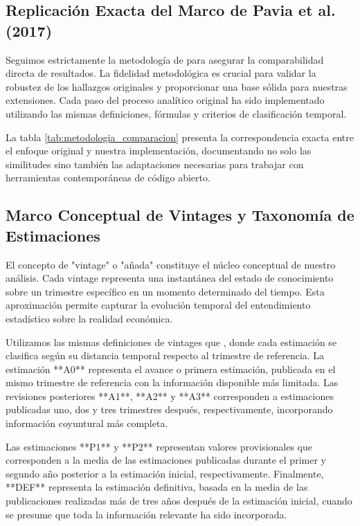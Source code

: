 \documentclass{article}
\begin{document}
\subsection{Replicación Exacta del Marco de Pavia et al. (2017)}

Seguimos estrictamente la metodología de \citet{pavia2017} para asegurar la comparabilidad directa de resultados. La fidelidad metodológica es crucial para validar la robustez de los hallazgos originales y proporcionar una base sólida para nuestras extensiones. Cada paso del proceso analítico original ha sido implementado utilizando las mismas definiciones, fórmulas y criterios de clasificación temporal.

La tabla \ref{tab:metodologia_comparacion} presenta la correspondencia exacta entre el enfoque original y nuestra implementación, documentando no solo las similitudes sino también las adaptaciones necesarias para trabajar con herramientas contemporáneas de código abierto.



\subsection{Marco Conceptual de Vintages y Taxonomía de Estimaciones}

El concepto de "vintage" o "añada" constituye el núcleo conceptual de nuestro análisis. Cada vintage representa una instantánea del estado de conocimiento sobre un trimestre específico en un momento determinado del tiempo. Esta aproximación permite capturar la evolución temporal del entendimiento estadístico sobre la realidad económica.

Utilizamos las mismas definiciones de vintages que \citet{pavia2017}, donde cada estimación se clasifica según su distancia temporal respecto al trimestre de referencia. La estimación **A0** representa el avance o primera estimación, publicada en el mismo trimestre de referencia con la información disponible más limitada. Las revisiones posteriores **A1**, **A2** y **A3** corresponden a estimaciones publicadas uno, dos y tres trimestres después, respectivamente, incorporando información coyuntural más completa.

Las estimaciones **P1** y **P2** representan valores provisionales que corresponden a la media de las estimaciones publicadas durante el primer y segundo año posterior a la estimación inicial, respectivamente. Finalmente, **DEF** representa la estimación definitiva, basada en la media de las publicaciones realizadas más de tres años después de la estimación inicial, cuando se presume que toda la información relevante ha sido incorporada.
\end{document}
